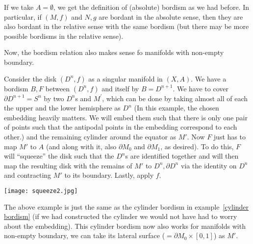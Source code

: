 \documentclass[a4paper,11pt]{article}
\begin{document}
\begin{remark}
    If we take \(A=\emptyset\), we get the definition of (absolute) bordism as we had before. In particular, if \((M,f)\) and \(N,g\) are bordant in the absolute sense, then they are also bordant in the relative sense with the same bordism (but there may be more possible bordisms in the relative sense).
\end{remark}

\begin{observation}
    Now, the bordism relation also makes sense fo manifolds with non-empty boundary.
\end{observation}

\begin{example}
    Consider the disk \((D^n,f)\) as a singular manifold in \((X,A)\). 
    We have a bordism \(B,F\) between \((D^n,f)\) and itself by \(B=D^{n+1}\). We have to cover \(\partial D^{n+1}=S^n\) by two \(D^n\)s and \(M^\prime\), which can be done by taking almost all of each the upper and the lower hemisphere as \(D^n\) 
    (In this example, the chosen embedding heavily matters. We will embed them such that there is only one pair of points such that the antipodal points in the embedding correspond to each other.) 
    and the remaining cylinder around the equator as \(M'\). 
    Now \(F\) just has to map \(M'\) to \(A\) (and along with it, also \(\partial M_0\) and \(\partial M_1\), as desired). 
    To do this, \(F\) will \enquote{squeeze} the disk such that the \(D^n\)s are identified together and will then map the resulting disk with the remains of \(M'\) to \(D^n,\partial D^n\) via the identity on \(D^n\) and contracting \(M'\) to its boundary. Lastly, apply \(f\).
    \begin{center}
        \texttt{[image: squeeze2.jpg]}
    \end{center}
\end{example}

\begin{remark}
    The above example is just the same as the cylinder bordism in example\ \ref{cylinder bordism} (if we had constructed the cylinder we would not have had to worry about the embedding). This cylinder bordism now also works for manifolds with non-empty boundary, we can take its lateral surface (\(=\partial M_0\times [0,1]\)) as \(M'\).
\end{remark}
\end{document}
